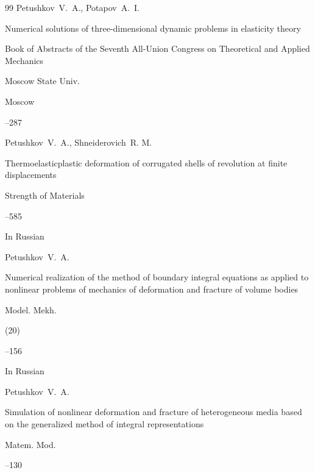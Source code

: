 \begin{thebibliography}{99}
\by Petushkov~V.~A., Potapov~A.~I.

\paper Numerical solutions of three-dimensional dynamic problems in elasticity theory

\inbook Book of Abstracts of the Seventh All-Union Congress on Theoretical and Applied Mechanics

\publ Moscow State Univ.

\publaddr Moscow


--287




\by Petushkov~V.~A., Shneiderovich~R. M.

\paper Thermoelasticplastic deformation of corrugated shells of revolution at finite displacements

\jour Strength of Materials




--585





\lang In Russian

\by  Petushkov~V.~A.

\paper Numerical realization of the method of boundary integral equations as applied to nonlinear problems of mechanics of deformation and fracture of volume bodies

\jour Model. Mekh.

(20)



--156




\lang In Russian

\by Petushkov~V.~A.

\paper Simulation of nonlinear deformation and fracture of heterogeneous media based on the generalized method of integral representations

\jour Matem. Mod.




--130




\end{thebibliography}

